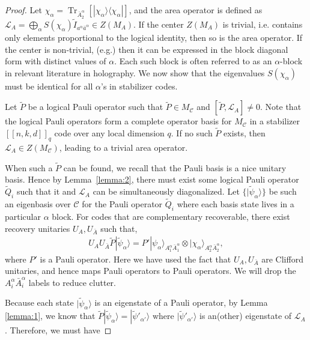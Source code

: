 \documentclass[a4paper,11pt]{article}
\theoremstyle{definition}
\numberwithin{equation}{section}
\DeclareMathOperator{\Tr}{Tr}
\begin{document}
\begin{proof}
Let $\chi_{\alpha}=\Tr_{\bar{A}_2^{\alpha}}[|\chi_{\alpha}\rangle\langle\chi_{\alpha}|]$, and the area operator is defined as $\mathcal{L}_A=\bigoplus_{\alpha}S(\chi_{\alpha})\tilde{I}_{a^{\alpha}\bar{a}^{\alpha}}\in Z(M_A)$.
If the center $Z(M_A)$ is trivial, i.e. contains only elements proportional to the logical identity, then so is the area operator. If the center is non-trivial, (e.g.\cite{Donnelly:2016qqt,Cao:2020ksw,Pollack:2021yij}) then 
it can be expressed in the block diagonal form with distinct values of $\alpha$. Each such block is often referred to as an $\alpha$-block in relevant literature in holography.  
We now show that the eigenvalues $S(\chi_{\alpha})$ must be identical for all $\alpha$'s in stabilizer codes. 


Let $\tilde{P}$ be a logical Pauli operator such that $\tilde{P}\in M_{\mathcal{C}}$ and $[\tilde{P},\mathcal{L}_{A}]\ne 0$. Note that the logical Pauli operators form a complete operator basis for $M_{\mathcal{C}}$ in a stabilizer $[[n,k,d]]_q$ code over any local dimension $q$. If no such $\tilde{P}$ exists, then $\mathcal{L}_A\in Z(M_{\mathcal{C}})$, leading to a trivial area operator. 



When such a $\tilde{P}$ can be found, we recall that the Pauli basis is a nice unitary basis. Hence by Lemma~\ref{lemma:2}, there must exist some logical Pauli operator $\tilde{Q}_i$ such that it and $\mathcal{L}_A$ can be simultaneously diagonalized. 
Let $\{|\tilde{\psi}_{\alpha}\rangle\}$ be such an eigenbasis over $\mathcal{C}$ for the Pauli operator $\tilde{Q}_i$ where each basis state lives in a particular $\alpha$ block.
For codes that are complementary recoverable, there exist recovery unitaries $U_A, U_{\bar{A}}$ such that, 
\begin{align}
    U_A U_{\bar{A}}\tilde{P}|\tilde{\psi}_{\alpha}\rangle= P' |\psi_{\alpha}\rangle_{A_1^{\alpha}\bar{A}_1^{\alpha}} \otimes |\chi_{\alpha}\rangle_{A_2^{\alpha} \bar{A}_2^{\alpha}},
\end{align}
where $P'$ is a Pauli operator. Here we have used the fact that $U_A,U_{\bar{A}}$ are Clifford unitaries, and hence maps Pauli operators to Pauli operators. We will drop the $A_i^{\alpha}\bar{A}_i^{\alpha}$ labels to reduce clutter.

 
 Because each state $|\tilde{\psi}_{\alpha}\rangle$ is an eigenstate of a Pauli operator, by Lemma \ref{lemma:1}, we know that $\tilde{P}|\tilde{\psi}_{\alpha}\rangle=|\tilde{\psi}'_{\alpha'}\rangle$ where $|\tilde{\psi}'_{\alpha'}\rangle$ is an(other) eigenstate of $\mathcal{L}_A$. Therefore, we must have 
 

\end{proof}
\end{document}
